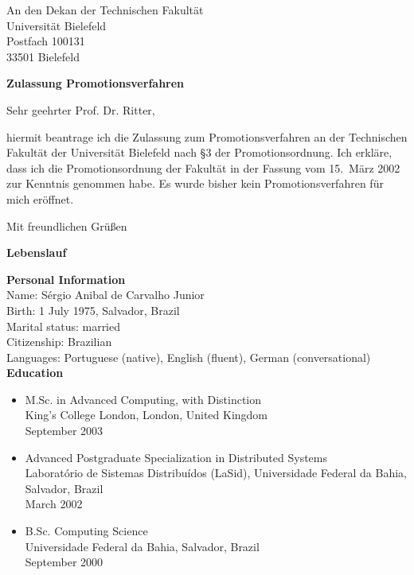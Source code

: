 \documentclass[a4paper,11pt]{letter}
\begin{document}
\begin{letter}{
  An den Dekan der Technischen Fakult\"at\\
  Universit\"at Bielefeld\\
  Postfach 100131\\
  33501 Bielefeld
}

\opening{ {\bf Zulassung Promotionsverfahren}}

Sehr geehrter Prof. Dr. Ritter,

hiermit beantrage ich die Zulassung zum Promotionsverfahren an der Technischen
Fakult\"at der Universit\"at Bielefeld nach \S3 der Promotionsordnung. Ich
erkl\"are, dass ich die Promotionsordnung der Fakult\"at in der Fassung vom 15.\ 
M\"arz 2002 zur Kenntnis genommen habe. Es wurde bisher kein Promotionsverfahren
f\"ur mich er\"offnet.

\closing{Mit freundlichen Gr\"u{\ss}en}


\newpage
{\bf\large Lebenslauf}

{\bf Personal Information}\\
Name: S\'ergio Anibal de Carvalho Junior\\
Birth: 1 July 1975, Salvador, Brazil\\
Marital status: married\\
Citizenship: Brazilian\\
Languages: Portuguese (native), English (fluent), German (conversational)\\

{\bf Education}
\begin{itemize}

\item M.Sc. in Advanced Computing, with Distinction\\
      King's College London, London, United Kingdom\\
      September 2003

\item Advanced Postgraduate Specialization in Distributed Systems\\
      Laborat\'orio de Sistemas Distribu\'idos (LaSid), Universidade Federal da
      Bahia, Salvador, Brazil\\
      March 2002

\item B.Sc. Computing Science\\
      Universidade Federal da Bahia, Salvador, Brazil\\
      September 2000


\end{itemize}
\end{letter}
\end{document}
